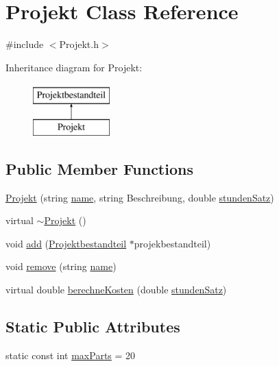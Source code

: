 \hypertarget{classProjekt}{}\section{Projekt Class Reference}
\label{classProjekt}


{\ttfamily \#include $<$Projekt.\+h$>$}

Inheritance diagram for Projekt\+:\begin{figure}[H]
\begin{center}
\leavevmode
\includegraphics[height=2.000000cm]{classProjekt}
\end{center}
\end{figure}
\subsection*{Public Member Functions}
\begin{DoxyCompactItemize}
\item 
\hyperlink{classProjekt_add70b5b0cdf0352c035894b25a138613}{Projekt} (string \hyperlink{classProjektbestandteil_a3592f75d5870371bd87c9a057f31241e}{name}, string Beschreibung, double \hyperlink{classProjekt_afac3a0828a5f2e976af1dbb46ac712ca}{stunden\+Satz})
\item 
virtual \hyperlink{classProjekt_a309c58dde12f9ae62764ad7a0f99056f}{$\sim$\+Projekt} ()
\item 
void \hyperlink{classProjekt_a6980c205cb2597e8f8af453d2902894a}{add} (\hyperlink{classProjektbestandteil}{Projektbestandteil} $\ast$projekbestandteil)
\item 
void \hyperlink{classProjekt_a21497c043d324409785f5dec182e39a1}{remove} (string \hyperlink{classProjektbestandteil_a3592f75d5870371bd87c9a057f31241e}{name})
\item 
virtual double \hyperlink{classProjekt_ae26b381f70891f93fd28cec57565d784}{berechne\+Kosten} (double \hyperlink{classProjekt_afac3a0828a5f2e976af1dbb46ac712ca}{stunden\+Satz})
\end{DoxyCompactItemize}
\subsection*{Static Public Attributes}
\begin{DoxyCompactItemize}
\item 
static const int \hyperlink{classProjekt_a2828c8ece2df6372db85967f774e61a4}{max\+Parts} = 20
\end{DoxyCompactItemize}

